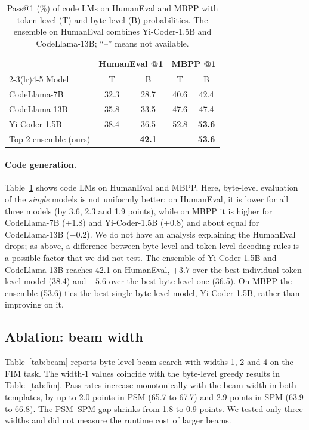 \documentclass{article} %
\begin{document}
\begin{table}[t]
\caption{Pass@1 (\%) of code LMs on HumanEval and MBPP with token-level (T) and byte-level (B) probabilities. The ensemble on HumanEval combines Yi-Coder-1.5B and CodeLlama-13B; ``--'' means not available.}
\label{tab:code}
\begin{center}
\begin{tabular}{lcccc}
\toprule
& \multicolumn{2}{c}{HumanEval @1} & \multicolumn{2}{c}{MBPP @1} \\
\cmidrule(lr){2-3}\cmidrule(lr){4-5}
Model & T & B & T & B \\
\midrule
CodeLlama-7B & 32.3 & 28.7 & 40.6 & 42.4 \\
CodeLlama-13B & 35.8 & 33.5 & 47.6 & 47.4 \\
Yi-Coder-1.5B & 38.4 & 36.5 & 52.8 & \textbf{53.6} \\
\midrule
Top-2 ensemble (ours) & -- & \textbf{42.1} & -- & \textbf{53.6} \\
\bottomrule
\end{tabular}
\end{center}
\end{table}

\paragraph{Code generation.}
Table~\ref{tab:code} shows code LMs on HumanEval and MBPP. Here, byte-level evaluation of the \emph{single} models is not uniformly better: on HumanEval, it is lower for all three models (by 3.6, 2.3 and 1.9 points), while on MBPP it is higher for CodeLlama-7B (+1.8) and Yi-Coder-1.5B (+0.8) and about equal for CodeLlama-13B ($-0.2$). We do not have an analysis explaining the HumanEval drops; as above, a difference between byte-level and token-level decoding rules is a possible factor that we did not test. The ensemble of Yi-Coder-1.5B and CodeLlama-13B reaches 42.1 on HumanEval, $+3.7$ over the best individual token-level model (38.4) and $+5.6$ over the best byte-level one (36.5). On MBPP the ensemble (53.6) ties the best single byte-level model, Yi-Coder-1.5B, rather than improving on it.

\subsection{Ablation: beam width}
Table~\ref{tab:beam} reports byte-level beam search with widths 1, 2 and 4 on the FIM task. The width-1 values coincide with the byte-level greedy results in Table~\ref{tab:fim}. Pass rates increase monotonically with the beam width in both templates, by up to 2.0 points in PSM (65.7 to 67.7) and 2.9 points in SPM (63.9 to 66.8). The PSM--SPM gap shrinks from 1.8 to 0.9 points. We tested only three widths and did not measure the runtime cost of larger beams.
\end{document}
